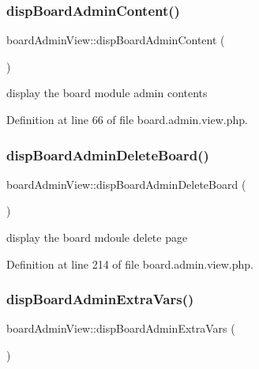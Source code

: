 \subsubsection{\texorpdfstring{disp\+Board\+Admin\+Content()}{dispBoardAdminContent()}}
{\footnotesize\ttfamily board\+Admin\+View\+::disp\+Board\+Admin\+Content (\begin{DoxyParamCaption}{ }\end{DoxyParamCaption})}



display the board module admin contents 



Definition at line 66 of file board.\+admin.\+view.\+php.

\hypertarget{classboardAdminView_a6db8342036e86100dd74b2af2e027a6f}{}\label{classboardAdminView_a6db8342036e86100dd74b2af2e027a6f} 
\subsubsection{\texorpdfstring{disp\+Board\+Admin\+Delete\+Board()}{dispBoardAdminDeleteBoard()}}
{\footnotesize\ttfamily board\+Admin\+View\+::disp\+Board\+Admin\+Delete\+Board (\begin{DoxyParamCaption}{ }\end{DoxyParamCaption})}



display the board mdoule delete page 



Definition at line 214 of file board.\+admin.\+view.\+php.

\hypertarget{classboardAdminView_a72aace20783257f66fa2eb16ee992ed7}{}\label{classboardAdminView_a72aace20783257f66fa2eb16ee992ed7} 
\subsubsection{\texorpdfstring{disp\+Board\+Admin\+Extra\+Vars()}{dispBoardAdminExtraVars()}}
{\footnotesize\ttfamily board\+Admin\+View\+::disp\+Board\+Admin\+Extra\+Vars (\begin{DoxyParamCaption}{ }\end{DoxyParamCaption})}



